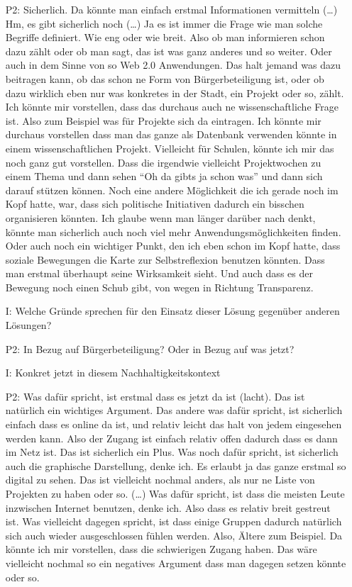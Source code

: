 \begin{itemize}
    \item[P2:] Sicherlich. Da k{\"o}nnte man einfach erstmal Informationen vermitteln (\dots) Hm, es gibt sicherlich noch (\dots) Ja es ist immer die Frage wie man solche Begriffe definiert. Wie eng oder wie breit. Also ob man informieren schon dazu z{\"a}hlt oder ob man sagt, das ist was ganz anderes und so weiter. Oder auch in dem Sinne von so Web 2.0 Anwendungen. Das halt jemand was dazu beitragen kann, ob das schon ne Form von B{\"u}rgerbeteiligung ist, oder ob dazu wirklich eben nur was konkretes in der Stadt, ein Projekt oder so, z{\"a}hlt. Ich k{\"o}nnte mir vorstellen, dass das durchaus auch ne wissenschaftliche Frage ist. Also zum Beispiel was f{\"u}r Projekte sich da eintragen. Ich k{\"o}nnte mir durchaus vorstellen dass man das ganze als Datenbank verwenden k{\"o}nnte in einem wissenschaftlichen Projekt. Vielleicht f{\"u}r Schulen, k{\"o}nnte ich mir das noch ganz gut vorstellen. Dass die irgendwie vielleicht Projektwochen zu einem Thema und dann sehen "`Oh da gibts ja schon was"' und dann sich darauf st{\"u}tzen k{\"o}nnen. Noch eine andere M{\"o}glichkeit die ich gerade noch im Kopf hatte, war, dass sich politische Initiativen dadurch ein bisschen organisieren k{\"o}nnten. Ich glaube wenn man l{\"a}nger dar{\"u}ber nach denkt, k{\"o}nnte man sicherlich auch noch viel mehr Anwendungsm{\"o}glichkeiten finden. Oder auch noch ein wichtiger Punkt, den ich eben schon im Kopf hatte, dass soziale Bewegungen die Karte zur Selbstreflexion benutzen k{\"o}nnten. Dass man erstmal {\"u}berhaupt seine Wirksamkeit sieht. Und auch dass es der Bewegung noch einen Schub gibt, von wegen in Richtung Transparenz.
    \item[I:] Welche Gr{\"u}nde sprechen f{\"u}r den Einsatz dieser L{\"o}sung gegen{\"u}ber anderen L{\"o}sungen?
    \item[P2:] In Bezug auf B{\"u}rgerbeteiligung? Oder in Bezug auf was jetzt?
    \item[I:] Konkret jetzt in diesem Nachhaltigkeitskontext
    \item[P2:] Was daf{\"u}r spricht, ist erstmal dass es jetzt da ist (lacht). Das ist nat{\"u}rlich ein wichtiges Argument. Das andere was daf{\"u}r spricht, ist sicherlich einfach dass es online da ist, und relativ leicht das halt von jedem eingesehen werden kann. Also der Zugang ist einfach relativ offen dadurch dass es dann im Netz ist. Das ist sicherlich ein Plus. Was noch daf{\"u}r spricht, ist sicherlich auch die graphische Darstellung, denke ich. Es erlaubt ja das ganze erstmal so digital zu sehen. Das ist vielleicht nochmal anders, als nur ne Liste von Projekten zu haben oder so. (\dots) Was daf{\"u}r spricht, ist dass die meisten Leute inzwischen Internet benutzen, denke ich. Also dass es relativ breit gestreut ist. Was vielleicht dagegen spricht, ist dass einige Gruppen dadurch nat{\"u}rlich sich auch wieder ausgeschlossen f{\"u}hlen werden. Also, {\"A}ltere zum Beispiel. Da k{\"o}nnte ich mir vorstellen, dass die schwierigen Zugang haben. Das w{\"a}re vielleicht nochmal so ein negatives Argument dass man dagegen setzen k{\"o}nnte oder so.

\end{itemize}

